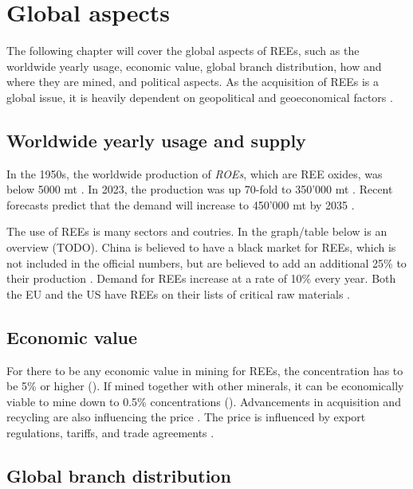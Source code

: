 
\section{Global aspects}

The following chapter will cover the global aspects of REEs, such as the worldwide yearly usage, economic value, global branch distribution, how and where they are mined, and political aspects. As the acquisition of REEs is a global issue, it is heavily dependent on geopolitical and geoeconomical factors \cite{politics2022}.

\subsection{Worldwide yearly usage and supply}

In the 1950s, the worldwide production of \textit{ROEs}, which are REE oxides, was below 5000 mt \cite{REEPrediction}. In 2023, the production was up 70-fold to 350'000 mt \cite{REEPrediction}. Recent forecasts predict that the demand will increase to 450'000 mt by 2035 \cite{REEPrediction}.

The use of REEs is many sectors and coutries. In the graph/table below is an overview (TODO). China is believed to have a black market for REEs, which is not included in the official numbers, but are believed to add an additional 25\% to their production \cite{britannica2024}. Demand for REEs increase at a rate of 10\% every year. Both the EU and the US have REEs on their lists of critical raw materials \cite{EU2014}\cite{US2018}.

\subsection{Economic value}

For there to be any economic value in mining for REEs, the concentration has to be 5\% or higher (\cite{britannica2024}). If mined together with other minerals, it can be economically viable to mine down to 0.5\% concentrations (\cite{britannica2024}). Advancements in acquisition and recycling are also influencing the price \cite{REELandscape}. The price is influenced by export regulations, tariffs, and trade agreements \cite{politics2022}.

\subsection{Global branch distribution}


